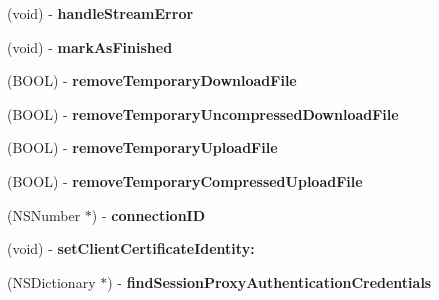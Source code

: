 \begin{DoxyCompactItemize}
\item 
\hypertarget{interface_a_s_i_h_t_t_p_request_ab792c755bbcec55490688d2b5aa729ec}{
(void) -\/ {\bfseries handle\-Stream\-Error}}
\label{interface_a_s_i_h_t_t_p_request_ab792c755bbcec55490688d2b5aa729ec}

\item 
\hypertarget{interface_a_s_i_h_t_t_p_request_a0b812d27bc2a7ad7715e6d890923426e}{
(void) -\/ {\bfseries mark\-As\-Finished}}
\label{interface_a_s_i_h_t_t_p_request_a0b812d27bc2a7ad7715e6d890923426e}

\item 
\hypertarget{interface_a_s_i_h_t_t_p_request_a0e68fd4f22a1b5cdcfb3e63a3cdacde9}{
(\-B\-O\-O\-L) -\/ {\bfseries remove\-Temporary\-Download\-File}}
\label{interface_a_s_i_h_t_t_p_request_a0e68fd4f22a1b5cdcfb3e63a3cdacde9}

\item 
\hypertarget{interface_a_s_i_h_t_t_p_request_af8ef43877926d01b8a51abb62dd2e208}{
(\-B\-O\-O\-L) -\/ {\bfseries remove\-Temporary\-Uncompressed\-Download\-File}}
\label{interface_a_s_i_h_t_t_p_request_af8ef43877926d01b8a51abb62dd2e208}

\item 
\hypertarget{interface_a_s_i_h_t_t_p_request_aaf8e3adbbf00110b67232158921553c0}{
(\-B\-O\-O\-L) -\/ {\bfseries remove\-Temporary\-Upload\-File}}
\label{interface_a_s_i_h_t_t_p_request_aaf8e3adbbf00110b67232158921553c0}

\item 
\hypertarget{interface_a_s_i_h_t_t_p_request_a4f8b19d66be57ffad0d6128182c98414}{
(\-B\-O\-O\-L) -\/ {\bfseries remove\-Temporary\-Compressed\-Upload\-File}}
\label{interface_a_s_i_h_t_t_p_request_a4f8b19d66be57ffad0d6128182c98414}

\item 
\hypertarget{interface_a_s_i_h_t_t_p_request_a3e06c0a51784d32cc8198f616e63c530}{
(\-N\-S\-Number $\ast$) -\/ {\bfseries connection\-I\-D}}
\label{interface_a_s_i_h_t_t_p_request_a3e06c0a51784d32cc8198f616e63c530}

\item 
\hypertarget{interface_a_s_i_h_t_t_p_request_a4f24e48396e06b8a81de111e19c1314a}{
(void) -\/ {\bfseries set\-Client\-Certificate\-Identity\-:}}
\label{interface_a_s_i_h_t_t_p_request_a4f24e48396e06b8a81de111e19c1314a}

\item 
\hypertarget{interface_a_s_i_h_t_t_p_request_a480d62ba0d9ba8d1a64b25b45fb2d965}{
(\-N\-S\-Dictionary $\ast$) -\/ {\bfseries find\-Session\-Proxy\-Authentication\-Credentials}}
\label{interface_a_s_i_h_t_t_p_request_a480d62ba0d9ba8d1a64b25b45fb2d965}


\end{DoxyCompactItemize}
